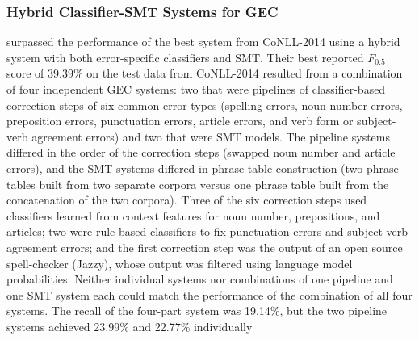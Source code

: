 


\subsubsection{Hybrid Classifier-SMT Systems for GEC}
\citet{Susanto2014SystemCorrection} surpassed the performance of the best system from CoNLL-2014 using a hybrid system with both error-specific classifiers and SMT. Their best reported $F_{0.5}$ score of 39.39\% on the test data from CoNLL-2014 resulted from a combination of four independent GEC systems: two that were pipelines of classifier-based correction steps of six common error types (spelling errors, noun number errors, preposition errors, punctuation errors, article errors, and verb form or subject-verb agreement errors) and two that were SMT models. The pipeline systems differed in the order of the correction steps (swapped noun number and article errors), and the SMT systems differed in phrase table construction (two phrase tables built from two separate corpora versus one phrase table built from the concatenation of the two corpora). Three of the six correction steps used classifiers learned from context features for noun number, prepositions, and articles; two were rule-based classifiers to fix punctuation errors and subject-verb agreement errors; and the first correction step was the output of an open source spell-checker (Jazzy), whose output was filtered using language model probabilities. Neither individual systems nor combinations of one pipeline and one SMT system each could match the performance of the combination of all four systems. The recall of the four-part system was 19.14\%, but the two pipeline systems achieved 23.99\% and 22.77\% individually

